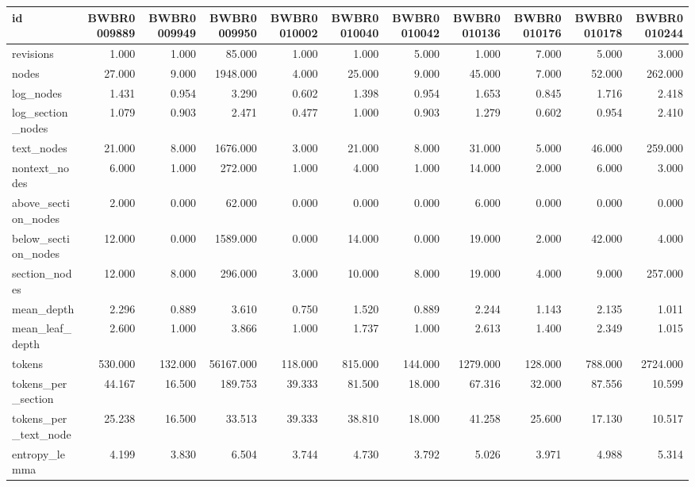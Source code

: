\begin{tabular}{lrrrrrrrrrr}
\toprule
id & BWBR0009889 & BWBR0009949 & BWBR0009950 & BWBR0010002 & BWBR0010040 & BWBR0010042 & BWBR0010136 & BWBR0010176 & BWBR0010178 & BWBR0010244 \\
\midrule
revisions & 1.000 & 1.000 & 85.000 & 1.000 & 1.000 & 5.000 & 1.000 & 7.000 & 5.000 & 3.000 \\
\cline{1-11}
nodes & 27.000 & 9.000 & 1948.000 & 4.000 & 25.000 & 9.000 & 45.000 & 7.000 & 52.000 & 262.000 \\
\cline{1-11}
log\_nodes & 1.431 & 0.954 & 3.290 & 0.602 & 1.398 & 0.954 & 1.653 & 0.845 & 1.716 & 2.418 \\
\cline{1-11}
log\_section\_nodes & 1.079 & 0.903 & 2.471 & 0.477 & 1.000 & 0.903 & 1.279 & 0.602 & 0.954 & 2.410 \\
\cline{1-11}
text\_nodes & 21.000 & 8.000 & 1676.000 & 3.000 & 21.000 & 8.000 & 31.000 & 5.000 & 46.000 & 259.000 \\
\cline{1-11}
nontext\_nodes & 6.000 & 1.000 & 272.000 & 1.000 & 4.000 & 1.000 & 14.000 & 2.000 & 6.000 & 3.000 \\
\cline{1-11}
above\_section\_nodes & 2.000 & 0.000 & 62.000 & 0.000 & 0.000 & 0.000 & 6.000 & 0.000 & 0.000 & 0.000 \\
\cline{1-11}
below\_section\_nodes & 12.000 & 0.000 & 1589.000 & 0.000 & 14.000 & 0.000 & 19.000 & 2.000 & 42.000 & 4.000 \\
\cline{1-11}
section\_nodes & 12.000 & 8.000 & 296.000 & 3.000 & 10.000 & 8.000 & 19.000 & 4.000 & 9.000 & 257.000 \\
\cline{1-11}
mean\_depth & 2.296 & 0.889 & 3.610 & 0.750 & 1.520 & 0.889 & 2.244 & 1.143 & 2.135 & 1.011 \\
\cline{1-11}
mean\_leaf\_depth & 2.600 & 1.000 & 3.866 & 1.000 & 1.737 & 1.000 & 2.613 & 1.400 & 2.349 & 1.015 \\
\cline{1-11}
tokens & 530.000 & 132.000 & 56167.000 & 118.000 & 815.000 & 144.000 & 1279.000 & 128.000 & 788.000 & 2724.000 \\
\cline{1-11}
tokens\_per\_section & 44.167 & 16.500 & 189.753 & 39.333 & 81.500 & 18.000 & 67.316 & 32.000 & 87.556 & 10.599 \\
\cline{1-11}
tokens\_per\_text\_node & 25.238 & 16.500 & 33.513 & 39.333 & 38.810 & 18.000 & 41.258 & 25.600 & 17.130 & 10.517 \\
\cline{1-11}
entropy\_lemma & 4.199 & 3.830 & 6.504 & 3.744 & 4.730 & 3.792 & 5.026 & 3.971 & 4.988 & 5.314 \\

\end{tabular}
